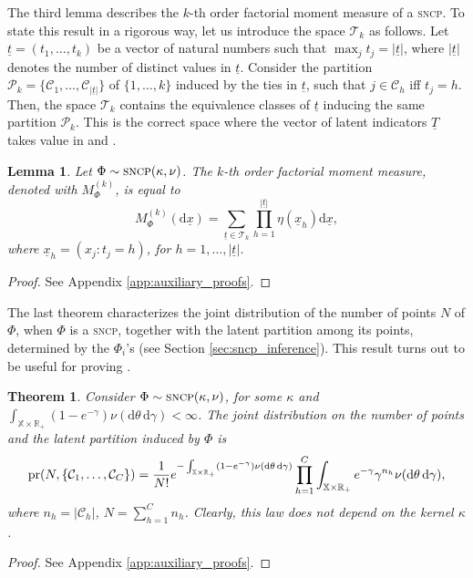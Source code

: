 \documentclass[11pt,a4paper,oneside]{article}
\newcommand{\calC}{\mathcal{C}}
\newcommand{\calT}{\mathcal{T}}
\newcommand{\calP}{\mathcal{P}}
\newcommand{\dd}{\mathrm d}
\newcommand{\X}{\mathbb{X}}
\newcommand{\R}{\mathbb{R}}
\newcommand{\prob}{{\rm pr}}
\newtheorem{theorem}{Theorem}
\newtheorem{lemma}{Lemma}
\theoremstyle{definition}
\theoremstyle{remark}
\begin{document}
The third lemma describes the $k$-th order factorial moment measure of a \textsc{sncp}. To state this result in a rigorous way, let us introduce the space $\calT_k$ as follows. Let $\underline{t} = (t_1,\ldots,t_k)$ be a vector of natural numbers such that $\max_j t_j = |\underline{t}|$, where $|\underline{t}|$ denotes the number of distinct values in $\underline{t}$. Consider the partition $\calP_k = \{\calC_1,\ldots,\calC_{|\underline{t}|}\}$ of $\{1,\ldots,k\}$ induced by the ties in $\underline{t}$, such that $j \in \calC_h$ iff $t_j = h$. Then, the space $\calT_k$ contains the equivalence classes of $\underline{t}$ inducing the same partition $\calP_k$. This is the correct space where the vector of latent indicators $\underline{T}$ takes value in  and . 
\begin{lemma}\label{lemma:k_factorial_sncp}
Let $\Phi \sim \textsc{sncp}(\kappa, \nu)$. The $k$-th order factorial moment measure, denoted with $M^{(k)}_{\Phi}$, is equal to 
\[
M^{(k)}_{\Phi}(\dd \underline{x}) = \sum_{\underline{t} \in \calT_k} \prod_{h=1}^{|\underline{t}|} \eta(\underline{x}_h)\dd \underline{x},
\]
where $\underline{x}_h = (x_j: t_j = h)$, for $h=1,\ldots,|\underline{t}|$.
\end{lemma}
\begin{proof}
    See Appendix \ref{app:auxiliary_proofs}.
\end{proof}

The last theorem characterizes the joint distribution of the number of points $N$ of $\Phi$, when $\Phi$ is a \textsc{sncp}, together with the latent partition among its points, determined by the $\Phi_i$'s (see  Section \ref{sec:sncp_inference}). This result turns out to be useful for proving  .



\begin{theorem}\label{prop:prior_partition_sncp}
Consider $\Phi \sim \textsc{sncp}(\kappa, \nu)$, for some $\kappa$ and $\int_{\X\times \R_+} (1-e^{-\gamma} ) \nu(\dd\theta \, \dd \gamma) < \infty$. The joint distribution on the number of points and the latent partition induced by $\Phi$ is
\[
\prob(N, \{\calC_1,\ldots, \calC_C\}) = \frac{1}{N!} e^{- \int_{\X\times\R_+}(1-e^{-\gamma}) \nu(\dd\theta \, \dd \gamma)} \prod_{h = 1}^C \int_{\X\times \R_+} e^{-\gamma} \gamma^{n_h} \nu(\dd\theta \, \dd \gamma), 
\]
where $n_h = | \calC_h |$, $N = \sum_{h=1}^C n_h$. Clearly, this law does not depend on the kernel $\kappa$.
\end{theorem}
\begin{proof}
    See Appendix \ref{app:auxiliary_proofs}.
\end{proof}
\end{document}
